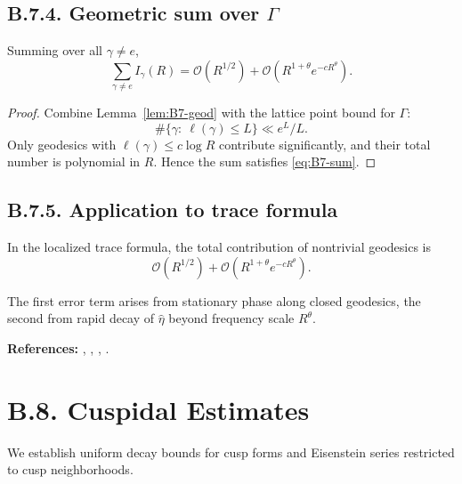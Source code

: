 \subsection*{B.7.4. Geometric sum over $\Gamma$}

\begin{proposition}\label{prop:B7-sum}
Summing over all $\gamma\ne e$,
\begin{equation}\label{eq:B7-sum}
\sum_{\gamma\ne e} I_\gamma(R)
=\mathcal{O}\!\left(R^{1/2}\right)+\mathcal{O}\!\left(R^{1+\theta}e^{-cR^\theta}\right).
\end{equation}
\end{proposition}

\begin{proof}
Combine Lemma~\ref{lem:B7-geod} with the lattice point bound for $\Gamma$:
\[
\#\{\gamma:\ \ell(\gamma)\le L\}\ll e^L/L.
\]
Only geodesics with $\ell(\gamma)\le c\log R$ contribute significantly, and their total number is polynomial in $R$.
Hence the sum satisfies \eqref{eq:B7-sum}.
\end{proof}

\subsection*{B.7.5. Application to trace formula}

\begin{corollary}\label{cor:B7-trace}
In the localized trace formula, the total contribution of nontrivial geodesics is
\[
\mathcal{O}\!\left(R^{1/2}\right)+\mathcal{O}\!\left(R^{1+\theta}e^{-cR^\theta}\right).
\]
\end{corollary}

\begin{remark}
The first error term arises from stationary phase along closed geodesics, the second from rapid decay of $\widehat{\eta}$ beyond frequency scale $R^\theta$.
\end{remark}

\medskip
\noindent\textbf{References:} \cite{Buser}, \cite{HejhalI}, \cite{HejhalII}, \cite{Zworski}.

\section{B.8. Cuspidal Estimates}\label{sec:B8}

We establish uniform decay bounds for cusp forms and Eisenstein series restricted to cusp neighborhoods.

